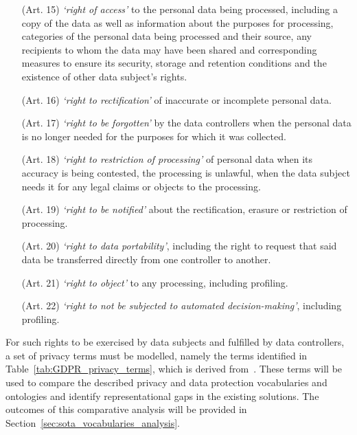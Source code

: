 \begin{enumerate}
  \item[(Art. 15)] \textit{`right of access'} to the personal data being processed, including a copy of the data as well as information about the purposes for processing, categories of the personal data being processed and their source, any recipients to whom the data may have been shared and corresponding measures to ensure its security, storage and retention conditions and the existence of other data subject's rights.
  \item[(Art. 16)] \textit{`right to rectification'} of inaccurate or incomplete personal data.
  \item[(Art. 17)] \textit{`right to be forgotten'}  by the data controllers when the personal data is no longer needed for the purposes for which it was collected.
  \item[(Art. 18)] \textit{`right to restriction of processing'} of personal data when its accuracy is being contested, the processing is unlawful, when the data subject needs it for any legal claims or objects to the processing.
  \item[(Art. 19)] \textit{`right to be notified'} about the rectification, erasure or restriction of processing.
  \item[(Art. 20)] \textit{`right to data portability'}, including the right to request that said data be transferred directly from one controller to another.
  \item[(Art. 21)] \textit{`right to object'} to any processing, including profiling.
  \item[(Art. 22)] \textit{`right to not be subjected to automated decision-making'}, including profiling.
\end{enumerate}

For such rights to be exercised by data subjects and fulfilled by data controllers, a set of privacy terms must be modelled, namely the terms identified in Table~\ref{tab:GDPR_privacy_terms}, which is derived from~\cite{esteves_analysis_2022}. These terms will be used to compare the described privacy and data protection vocabularies and ontologies and identify representational gaps in the existing solutions. The outcomes of this comparative analysis will be provided in Section~\ref{sec:sota_vocabularies_analysis}.


